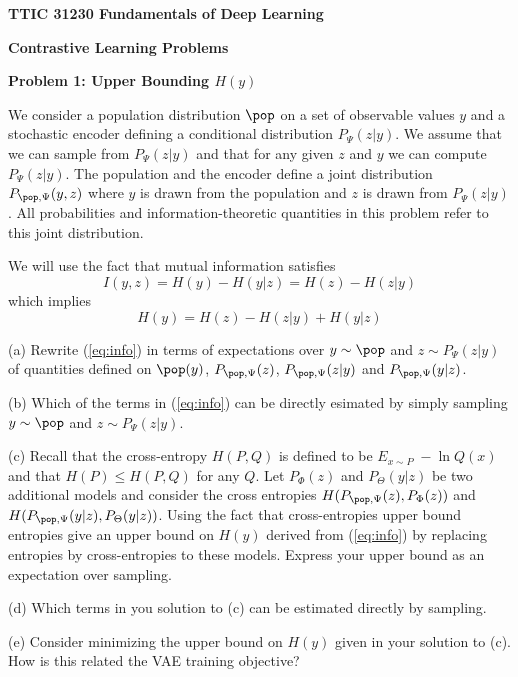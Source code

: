 \documentclass{article}
\newcommand{\solution}[1]{}
\begin{document}
\centerline{\bf TTIC 31230 Fundamentals of Deep Learning}
\bigskip
\centerline{\bf Contrastive Learning Problems}

\bigskip
\bigskip


\bigskip

{\bf Problem 1: Upper Bounding $H(y)$}

\medskip
We consider a population distribution $\pop$ on a set of observable values $y$ and a stochastic encoder defining a conditional distribution $P_\Psi(z|y)$.
We assume that we can sample from $P_\Psi(z|y)$ and that for any given $z$ and $y$ we can compute $P_\Psi(z|y)$.
The population and the encoder define a joint distribution $P_{\pop,\Psi}(y,z)$ where $y$ is drawn from the population and $z$ is drawn from $P_\Psi(z|y)$.
All probabilities and information-theoretic quantities in this problem refer to this joint distribution.

\vfill
We will use the fact that mutual information satisfies
$$I(y,z) = H(y) - H(y|z) = H(z)- H(z|y)$$
which implies
\begin{equation}
  \label{eq:info}
H(y) = H(z) - H(z|y) + H(y|z)
\end{equation}

\medskip
(a) Rewrite (\ref{eq:info}) in terms of expectations over $y \sim \pop$ and $z \sim P_\Psi(z|y)$ of quantities defined on $\pop(y)$, $P_{\pop,\Psi}(z)$, $P_{\pop,\Psi}(z|y)$ and $P_{\pop,\Psi}(y|z)$.

\solution{
  $$E_{y \sim \pop} \; -\ln\;\pop(y) = E_{y \sim \pop,\;z \sim P_\Psi(z|y)}\;\; - \ln P_{\Psi}(z) + \ln P_{\pop,\Psi}(z|y) - \ln P_{\pop,\Psi}(y|z)$$
}

\medskip
(b) Which of the terms in (\ref{eq:info}) can be directly esimated by simply sampling $y \sim \pop$ and $z \sim P_\Psi(z|y)$.

\solution{
  Just the middle term $H(z|y)$.}

\medskip

(c) Recall that the cross-entropy $H(P,Q)$ is defined to be $E_{x \sim P} \;-\ln Q(x)$ and that $H(P) \leq H(P,Q)$ for any $Q$.
Let $P_\Phi(z)$ and $P_\Theta(y|z)$ be two additional models and consider the cross entropies $H(P_{\pop,\Psi}(z),P_\Phi(z))$ and $H(P_{\pop,\Psi}(y|z),P_\Theta(y|z))$.
Using the fact that cross-entropies upper bound entropies give an upper bound on $H(y)$ derived from (\ref{eq:info}) by replacing entropies by cross-entropies to these models.
Express your upper bound as an expectation over sampling.

\solution{
  $$H(y) \leq  E_{y \sim \pop,\;z \sim P_\Psi(z|y)}\;\; - \ln P_\Phi(z)\; \;+ \ln P_{\Psi}(z|y)\; - \ln P_{\Theta}(y|z)$$}


\medskip
(d) Which terms in you solution to (c) can be estimated directly by sampling.

\solution{All}

\medskip
(e) Consider minimizing the upper bound on $H(y)$ given in your solution to (c).  How is this related the VAE training objective?

\solution{It is exactly the same.}
\end{document}
